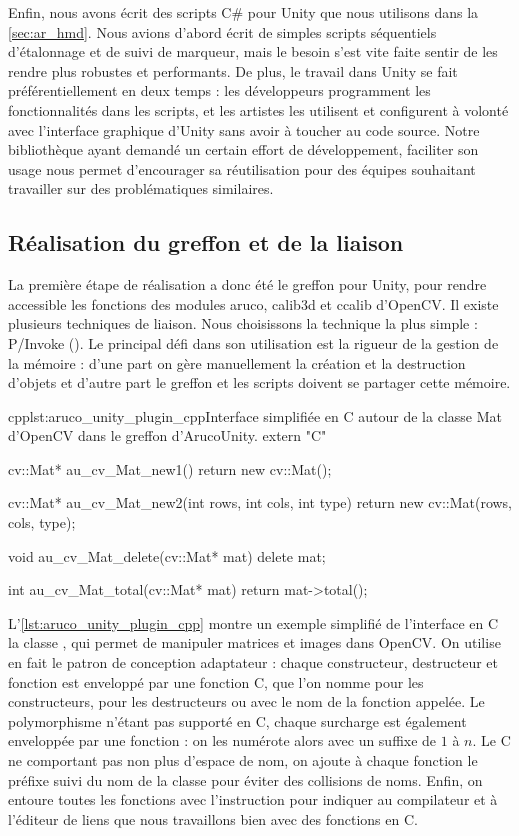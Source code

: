 Enfin, nous avons écrit des scripts C\# pour Unity que nous utilisons dans la \autoref{sec:ar_hmd}. Nous avions d'abord écrit de simples scripts séquentiels d'étalonnage et de suivi de marqueur, mais le besoin s'est vite faite sentir de les rendre plus robustes et performants. De plus, le travail dans Unity se fait préférentiellement en deux temps : les développeurs programment les fonctionnalités dans les scripts, et les artistes les utilisent et configurent à volonté avec l'interface graphique d'Unity sans avoir à toucher au code source. Notre bibliothèque ayant demandé un certain effort de développement, faciliter son usage nous permet d'encourager sa réutilisation pour des équipes souhaitant travailler sur des problématiques similaires.

\subsection{Réalisation du greffon et de la liaison}
La première étape de réalisation a donc été le greffon pour Unity, pour rendre accessible les fonctions des modules aruco, calib3d et ccalib d'OpenCV. Il existe plusieurs techniques de liaison. Nous choisissons la technique la plus simple : P/Invoke (). Le principal défi dans son utilisation est la rigueur de la gestion de la mémoire : d'une part on gère manuellement la création et la destruction d'objets et d'autre part le greffon et les scripts doivent se partager cette mémoire.

\begin{listingETS}{cpp}{lst:aruco_unity_plugin_cpp}{Interface simplifiée en C autour de la classe Mat d'OpenCV dans le greffon d'ArucoUnity.}
  extern "C" {
    cv::Mat* au_cv_Mat_new1() {
      return new cv::Mat();
    }

    cv::Mat* au_cv_Mat_new2(int rows, int cols, int type) {
      return new cv::Mat(rows, cols, type);
    }
    
    void au_cv_Mat_delete(cv::Mat* mat) {
      delete mat;
    }

    int au_cv_Mat_total(cv::Mat* mat) {
      return mat->total();
    }
  }
\end{listingETS}

L'\autoref{lst:aruco_unity_plugin_cpp} montre un exemple simplifié de l'interface en C la classe , qui permet de manipuler matrices et images dans OpenCV. On utilise en fait le patron de conception adaptateur : chaque constructeur, destructeur et fonction est enveloppé par une fonction C, que l'on nomme  pour les constructeurs,  pour les destructeurs ou avec le nom de la fonction appelée. Le polymorphisme n'étant pas supporté en C, chaque surcharge est également enveloppée par une fonction : on les numérote alors avec un suffixe de $1$ à $n$. Le C ne comportant pas non plus d'espace de nom, on ajoute à chaque fonction le préfixe  suivi du nom de la classe pour éviter des collisions de noms. Enfin, on entoure toutes les fonctions avec l'instruction  pour indiquer au compilateur et à l'éditeur de liens que nous travaillons bien avec des fonctions en C.

